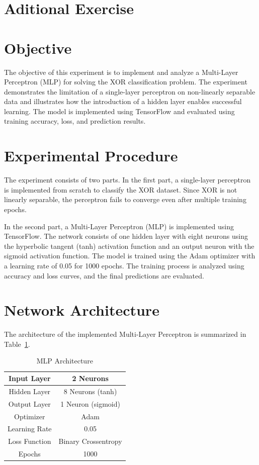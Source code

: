 \documentclass[11pt]{article}
\begin{document}
\section*{Aditional Exercise}
\section{Objective}

The objective of this experiment is to implement and analyze a Multi-Layer Perceptron (MLP) for solving the XOR classification problem. The experiment demonstrates the limitation of a single-layer perceptron on non-linearly separable data and illustrates how the introduction of a hidden layer enables successful learning. The model is implemented using TensorFlow and evaluated using training accuracy, loss, and prediction results.

\section{Experimental Procedure}

The experiment consists of two parts. In the first part, a single-layer perceptron is implemented from scratch to classify the XOR dataset. Since XOR is not linearly separable, the perceptron fails to converge even after multiple training epochs.

In the second part, a Multi-Layer Perceptron (MLP) is implemented using TensorFlow. The network consists of one hidden layer with eight neurons using the hyperbolic tangent (tanh) activation function and an output neuron with the sigmoid activation function. The model is trained using the Adam optimizer with a learning rate of 0.05 for 1000 epochs. The training process is analyzed using accuracy and loss curves, and the final predictions are evaluated.

\section{Network Architecture}

The architecture of the implemented Multi-Layer Perceptron is summarized in Table~\ref{tab:architecture}.

\begin{table}[H]
\centering
\caption{MLP Architecture}
\label{tab:architecture}
\begin{tabular}{|c|c|}
\hline
Input Layer & 2 Neurons \\ \hline
Hidden Layer & 8 Neurons (tanh) \\ \hline
Output Layer & 1 Neuron (sigmoid) \\ \hline
Optimizer & Adam \\ \hline
Learning Rate & 0.05 \\ \hline
Loss Function & Binary Crossentropy \\ \hline
Epochs & 1000 \\ \hline
\end{tabular}
\end{table}
\end{document}
